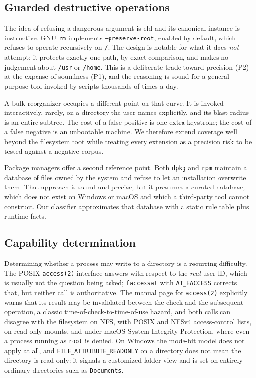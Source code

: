 \documentclass[11pt,a4paper]{article}
\newcommand{\code}[1]{\texttt{\small #1}}
\begin{document}
\subsection{Guarded destructive operations}

The idea of refusing a dangerous argument is old and its canonical instance is
instructive. GNU \code{rm} implements \code{--preserve-root}, enabled by default,
which refuses to operate recursively on \code{/}. The design is notable for what it
does \emph{not} attempt: it protects exactly one path, by exact comparison, and makes
no judgement about \code{/usr} or \code{/home}. This is a deliberate trade toward
precision (P2) at the expense of soundness (P1), and the reasoning is sound for a
general-purpose tool invoked by scripts thousands of times a day.

A bulk reorganizer occupies a different point on that curve. It is invoked
interactively, rarely, on a directory the user names explicitly, and its blast radius
is an entire subtree. The cost of a false positive is one extra keystroke; the cost of
a false negative is an unbootable machine. We therefore extend coverage well beyond
the filesystem root while treating every extension as a precision risk to be tested
against a negative corpus.

Package managers offer a second reference point. Both \code{dpkg} and \code{rpm}
maintain a database of files owned by the system and refuse to let an installation
overwrite them. That approach is sound and precise, but it presumes a curated
database, which does not exist on Windows or macOS and which a third-party tool cannot
construct. Our classifier approximates that database with a static rule table plus
runtime facts.

\subsection{Capability determination}

Determining whether a process may write to a directory is a recurring difficulty. The
POSIX \code{access(2)} interface answers with respect to the \emph{real} user ID,
which is usually not the question being asked; \code{faccessat} with
\code{AT\_EACCESS} corrects that, but neither call is authoritative. The manual page
for \code{access(2)} explicitly warns that its result may be invalidated between the
check and the subsequent operation, a classic time-of-check-to-time-of-use hazard,
and both calls can disagree with the filesystem on NFS, with POSIX and NFSv4
access-control lists, on read-only mounts, and under macOS System Integrity
Protection, where even a process running as \code{root} is denied. On Windows the
mode-bit model does not apply at all, and \code{FILE\_ATTRIBUTE\_READONLY} on a
directory does not mean the directory is read-only: it signals a customized folder
view and is set on entirely ordinary directories such as \code{Documents}.
\end{document}

